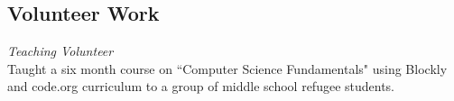 \documentclass[margin,line]{resume}
\begin{document}
\begin{resume}
\section{Volunteer Work}
{\small
  {\sl Teaching Volunteer} \\
  Taught a six month course on ``Computer Science Fundamentals" using Blockly and code.org curriculum
  to a group of middle school refugee students.
}
\end{resume}
\end{document}
